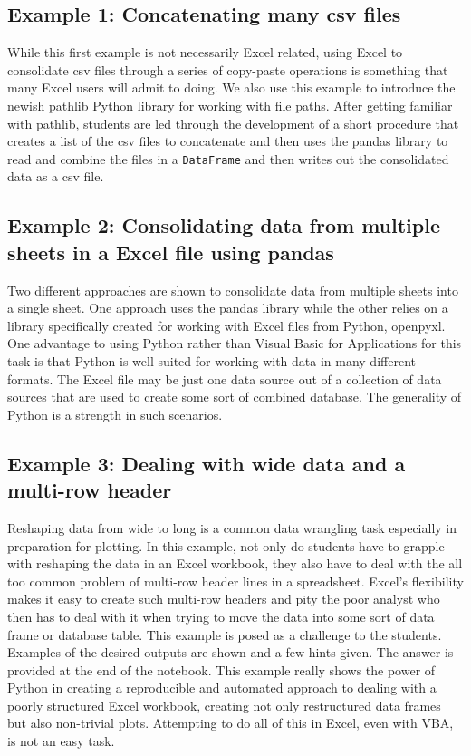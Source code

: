 \documentclass[ited,blindrev]{informs3}              %
\newcommand{\code}[1]{\texttt{#1}}
\begin{document}
\subsection{Example 1: Concatenating many csv files}

While this first example is not necessarily Excel related, using Excel to consolidate csv files through a series of copy-paste operations is something that many Excel users will admit to doing. We also use this example to introduce the newish pathlib Python library for working with file paths. After getting familiar with pathlib, students are led through the development of a short procedure that creates a list of the csv files to concatenate and then uses the pandas library to read and combine the files in a \code{DataFrame} and then writes out the consolidated data as a csv file.

\subsection{Example 2: Consolidating data from multiple sheets in a Excel file using pandas}

Two different approaches are shown to consolidate data from multiple sheets into a single sheet. One approach uses the pandas library while the other relies on a library specifically created for working with Excel files from Python, openpyxl. One advantage to using Python rather than Visual Basic for Applications for this task is that Python is well suited for working with data in many different formats. The Excel file may be just one data source out of a collection of data sources that are used to create some sort of combined database. The generality of Python is a strength in such scenarios.

\subsection{Example 3: Dealing with wide data and a multi-row header}

Reshaping data from wide to long is a common data wrangling task especially in preparation for plotting. In this example, not only do students have to grapple with reshaping the data in an Excel workbook, they also have to deal with the all too common problem of multi-row header lines in a spreadsheet. Excel's flexibility makes it easy to create such multi-row headers and pity the poor analyst who then has to deal with it when trying to move the data into some sort of data frame or database table. This example is posed as a challenge to the students. Examples of the desired outputs are shown and a few hints given. The answer is provided at the end of the notebook. This example really shows the power of Python in creating a reproducible and automated approach to dealing with a poorly structured Excel workbook, creating not only restructured data frames but also non-trivial plots. Attempting to do all of this in Excel, even with VBA, is not an easy task.
\end{document}

